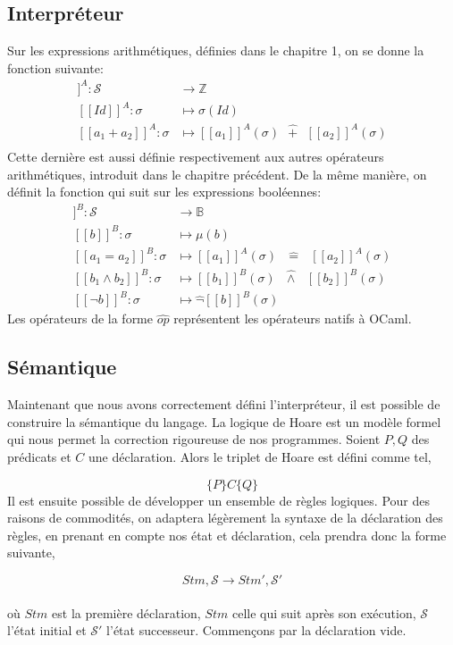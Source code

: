 \documentclass[a4paper, 12pt]{article}
\begin{document}
\subsection{Interpréteur}
Sur les expressions arithmétiques, définies dans le chapitre 1, on se donne la fonction suivante:
\begin{align*}
	[\![Exp_a]\!]^A : \mathcal{S} &\longrightarrow \mathbb{Z}\\
	[\![Id]\!]^A : \sigma &\longmapsto \sigma(Id)\\
	[\![a_1+a_2]\!]^A : \sigma &\longmapsto [\![a_1]\!]^A(\sigma)\text{ }\hat{+}\text{ }[\![a_2]\!]^A(\sigma)\\
\end{align*}
Cette dernière est aussi définie respectivement aux autres opérateurs arithmétiques, introduit dans le chapitre précédent.
De la même manière, on définit la fonction qui suit sur les expressions booléennes:
\begin{align*}
	[\![Exp_b]\!]^{B} : \mathcal{S} &\longrightarrow \mathbb{B}\\	
	[\![b]\!]^{B} : \sigma &\longmapsto \mu(b)\\
	[\![a_1 = a_2]\!]^B : \sigma &\longmapsto [\![a_1]\!]^{A}(\sigma)\text{ }\hat{=}\text{ }[\![a_2]\!]^A(\sigma)\\
	[\![b_1 \wedge b_2]\!]^B : \sigma &\longmapsto [\![b_1]\!]^B(\sigma)\text{ }\hat{\wedge}\text{ }[\![b_2]\!]^B(\sigma)\\
	[\![\neg b]\!]^B : \sigma &\longmapsto \hat{\neg}[\![b]\!]^B(\sigma)
\end{align*}
Les opérateurs de la forme $\hat{op}$ représentent les opérateurs natifs à OCaml.

\subsection{Sémantique}
Maintenant que nous avons correctement défini l'interpréteur, il est possible de construire la sémantique du langage.
La logique de Hoare est un modèle formel qui nous permet la correction rigoureuse de nos programmes. Soient $P, Q$ des 
prédicats et $C$ une déclaration. Alors le triplet de Hoare est défini comme tel,

$$\{P\}C\{Q\}$$
Il est ensuite possible de développer un ensemble de règles logiques. Pour des raisons de commodités, on adaptera légèrement 
la syntaxe de la déclaration des règles, en prenant en compte nos état et déclaration, cela prendra donc la forme suivante,

$$Stm, \mathcal{S} \longrightarrow Stm', \mathcal{S}'$$
\\
où $Stm$ est la première déclaration, $Stm$ celle qui suit après son exécution, $\mathcal{S}$ l'état initial et $\mathcal{S}'$ 
l'état successeur. Commençons par la déclaration vide.
\end{document}
